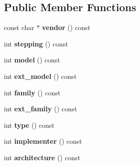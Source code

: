 \subsection*{Public Member Functions}
\begin{DoxyCompactItemize}
\item 
const char $\ast$ {\bfseries vendor} () const \hypertarget{classv8_1_1base_1_1_c_p_u_a4a5c457ee27396a80acb9623157980b9}{}\label{classv8_1_1base_1_1_c_p_u_a4a5c457ee27396a80acb9623157980b9}

\item 
int {\bfseries stepping} () const \hypertarget{classv8_1_1base_1_1_c_p_u_aa9cf4f2582be4eae2d3dbf6e38f07a77}{}\label{classv8_1_1base_1_1_c_p_u_aa9cf4f2582be4eae2d3dbf6e38f07a77}

\item 
int {\bfseries model} () const \hypertarget{classv8_1_1base_1_1_c_p_u_ada2f728196ec09bbd317966ae5cf8bad}{}\label{classv8_1_1base_1_1_c_p_u_ada2f728196ec09bbd317966ae5cf8bad}

\item 
int {\bfseries ext\+\_\+model} () const \hypertarget{classv8_1_1base_1_1_c_p_u_a9e408166207177d4e0fe37808f36ba57}{}\label{classv8_1_1base_1_1_c_p_u_a9e408166207177d4e0fe37808f36ba57}

\item 
int {\bfseries family} () const \hypertarget{classv8_1_1base_1_1_c_p_u_a0c37ac14f605ab57bbe9c5b7d80e8248}{}\label{classv8_1_1base_1_1_c_p_u_a0c37ac14f605ab57bbe9c5b7d80e8248}

\item 
int {\bfseries ext\+\_\+family} () const \hypertarget{classv8_1_1base_1_1_c_p_u_a8acbf122cb33b4dc972ea26da23e14db}{}\label{classv8_1_1base_1_1_c_p_u_a8acbf122cb33b4dc972ea26da23e14db}

\item 
int {\bfseries type} () const \hypertarget{classv8_1_1base_1_1_c_p_u_a7192826c77da93abe2184e4ddb24df8e}{}\label{classv8_1_1base_1_1_c_p_u_a7192826c77da93abe2184e4ddb24df8e}

\item 
int {\bfseries implementer} () const \hypertarget{classv8_1_1base_1_1_c_p_u_ab0879adaae47cbab874f1cc71e16c51e}{}\label{classv8_1_1base_1_1_c_p_u_ab0879adaae47cbab874f1cc71e16c51e}

\item 
int {\bfseries architecture} () const \hypertarget{classv8_1_1base_1_1_c_p_u_a306884f53541f7b3409c476684c54fcf}{}\label{classv8_1_1base_1_1_c_p_u_a306884f53541f7b3409c476684c54fcf}


\end{DoxyCompactItemize}
